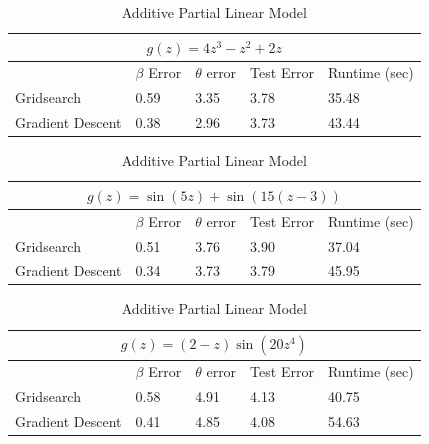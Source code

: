 \documentclass[10pt,letterpaper]{article}
\begin{document}
\begin{table}
\begin{center}
\begin{tabular}{| l | l | l | l | l | }
\hline
\multicolumn{5}{|c|}{$g(z) = 4z^3 - z^2 + 2z$}\\
\hline
 & $\beta$ Error & $\theta$ error & Test Error & Runtime (sec) \\
\hline
Gridsearch & 0.59 & 3.35 & 3.78 & 35.48 \\
\hline
Gradient Descent & 0.38 & 2.96 & 3.73 & 43.44 \\
\hline
\end{tabular}

\begin{tabular}{| l | l | l | l | l | }
\hline
\multicolumn{5}{|c|}{$g(z) = \sin(5z) + \sin(15(z - 3))$}\\
\hline
 & $\beta$ Error & $\theta$ error & Test Error & Runtime (sec) \\
\hline
Gridsearch & 0.51 & 3.76 & 3.90 & 37.04 \\
\hline
Gradient Descent & 0.34 & 3.73 & 3.79 & 45.95 \\
\hline
\end{tabular}

\begin{tabular}{| l | l | l | l | l | }
\hline
\multicolumn{5}{|c|}{$g(z) = (2-z)\sin(20z^4)$}\\
\hline
 & $\beta$ Error & $\theta$ error & Test Error & Runtime (sec) \\
\hline
Gridsearch & 0.58 & 4.91 & 4.13 & 40.75 \\
\hline
Gradient Descent & 0.41 & 4.85 & 4.08 & 54.63 \\
\hline
\end{tabular}
\end{center}
\caption {Additive Partial Linear Model}
\label{ref:aplm}
\end{table}

\end{document}
